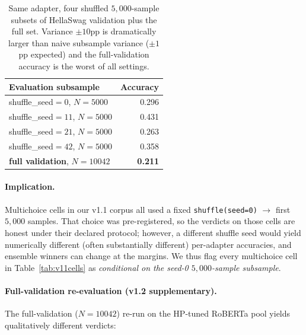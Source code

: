 \documentclass[11pt]{article}
\begin{document}
\begin{table}[h]
\centering
\caption{Same adapter, four shuffled $5{,}000$-sample subsets of HellaSwag validation plus the full set. Variance $\pm 10$pp is dramatically larger than naive subsample variance ($\pm 1$pp expected) and the full-validation accuracy is the worst of all settings.}
\label{tab:splitvar}
\small
\setlength{\tabcolsep}{5pt}
\begin{tabular}{@{}lr@{}}
\toprule
Evaluation subsample & Accuracy \\
\midrule
shuffle\_seed$=0$, $N{=}5000$ & 0.296 \\
shuffle\_seed$=11$, $N{=}5000$ & 0.431 \\
shuffle\_seed$=21$, $N{=}5000$ & 0.263 \\
shuffle\_seed$=42$, $N{=}5000$ & 0.358 \\
\midrule
\textbf{full validation}, $N{=}10042$ & \textbf{0.211} \\
\bottomrule
\end{tabular}
\end{table}

\paragraph{Implication.} Multichoice cells in our v1.1 corpus all used a fixed \texttt{shuffle(seed=0)} $\to$ first $5{,}000$ samples. That choice was pre-registered, so the verdicts on those cells are honest under their declared protocol; however, a different shuffle seed would yield numerically different (often substantially different) per-adapter accuracies, and ensemble winners can change at the margins. We thus flag every multichoice cell in Table~\ref{tab:v11cells} as \emph{conditional on the seed-0 $5{,}000$-sample subsample}.

\paragraph{Full-validation re-evaluation (v1.2 supplementary).} The full-validation ($N{=}10042$) re-run on the HP-tuned RoBERTa pool yields qualitatively different verdicts:
\end{document}
